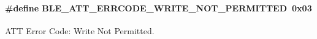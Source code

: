\paragraph[{\texorpdfstring{B\+L\+E\+\_\+\+A\+T\+T\+\_\+\+E\+R\+R\+C\+O\+D\+E\+\_\+\+W\+R\+I\+T\+E\+\_\+\+N\+O\+T\+\_\+\+P\+E\+R\+M\+I\+T\+T\+ED}{BLE_ATT_ERRCODE_WRITE_NOT_PERMITTED}}]{\setlength{\rightskip}{0pt plus 5cm}\#define B\+L\+E\+\_\+\+A\+T\+T\+\_\+\+E\+R\+R\+C\+O\+D\+E\+\_\+\+W\+R\+I\+T\+E\+\_\+\+N\+O\+T\+\_\+\+P\+E\+R\+M\+I\+T\+T\+ED~0x03}\hypertarget{group___b_l_e___a_t_t___e_r_r_o_r___c_o_d_e_s_gaaf157583d955a24b347b0261c8daa2e8}{}\label{group___b_l_e___a_t_t___e_r_r_o_r___c_o_d_e_s_gaaf157583d955a24b347b0261c8daa2e8}
A\+TT Error Code\+: Write Not Permitted. 
